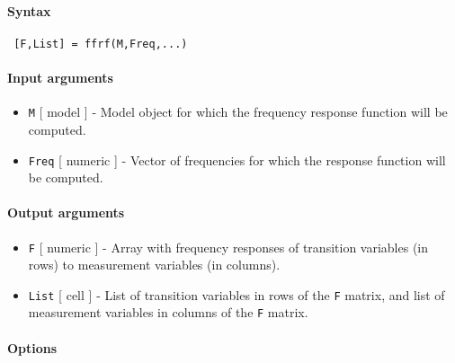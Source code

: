 


	\paragraph{Syntax}
 
 \begin{verbatim}
 [F,List] = ffrf(M,Freq,...)
 \end{verbatim}
 
 \paragraph{Input arguments}
 
 \begin{itemize}
 \item
   \texttt{M} {[} model {]} - Model object for which the frequency
   response function will be computed.
 \item
   \texttt{Freq} {[} numeric {]} - Vector of frequencies for which the
   response function will be computed.
 \end{itemize}
 
 \paragraph{Output arguments}
 
 \begin{itemize}
 \item
   \texttt{F} {[} numeric {]} - Array with frequency responses of
   transition variables (in rows) to measurement variables (in columns).
 \item
   \texttt{List} {[} cell {]} - List of transition variables in rows of
   the \texttt{F} matrix, and list of measurement variables in columns of
   the \texttt{F} matrix.
 \end{itemize}
 
 \paragraph{Options}
 
